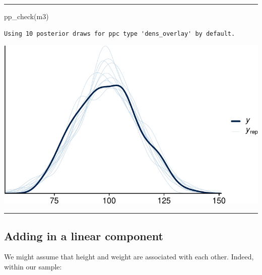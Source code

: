 \documentclass[
  letterpaper,
  DIV=11,
  numbers=noendperiod]{scrartcl}
\newenvironment{Shaded}{\begin{snugshade}}{\end{snugshade}}
\newcommand{\FunctionTok}[1]{\textcolor[rgb]{0.28,0.35,0.67}{#1}}
\newcommand{\NormalTok}[1]{\textcolor[rgb]{0.00,0.23,0.31}{#1}}
\newcommand{\SpecialCharTok}[1]{\textcolor[rgb]{0.37,0.37,0.37}{#1}}
\begin{document}
\begin{center}\rule{0.5\linewidth}{0.5pt}\end{center}

\begin{Shaded}
\begin{Highlighting}[]
\FunctionTok{pp\_check}\NormalTok{(m3)}
\end{Highlighting}
\end{Shaded}

\begin{verbatim}
Using 10 posterior draws for ppc type 'dens_overlay' by default.
\end{verbatim}

\includegraphics[width=17.1875in,height=\textheight]{lecture02-1_files/figure-pdf/unnamed-chunk-24-1.pdf}

\begin{center}\rule{0.5\linewidth}{0.5pt}\end{center}

\subsection{Adding in a linear
component}\label{adding-in-a-linear-component}

We might assume that height and weight are associated with each other.
Indeed, within our sample:

\begin{Shaded}
\end{Shaded}
\end{document}
